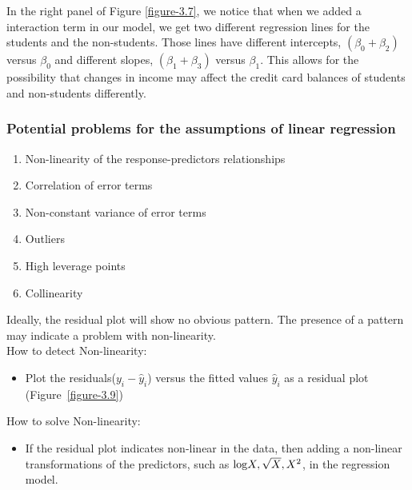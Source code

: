 \documentclass[12pt,a4paper]{article}%
\theoremstyle{definition}
\theoremstyle{plain}
\numberwithin{equation}{section}
\newcounter{subsubsubsection}[subsubsection]
\begin{document}
In the right panel of Figure \ref{figure-3.7}, we notice that when we added a interaction term in our model, we get two different regression lines for the students and the non-students.
Those lines have different intercepts, $(\beta_{0}+\beta_{2})$ versus $\beta_{0}$ and different slopes, $(\beta_{1}+\beta_{3})$ versus $\beta_{1}$.
This allows for the possibility that changes in income may affect the credit card balances of students and non-students differently.


\subsubsection{\textbf{Potential problems for the assumptions of linear regression}}
\begin{enumerate}
\item Non-linearity of the response-predictors relationships
\item Correlation of error terms
\item Non-constant variance of error terms
\item Outliers
\item High leverage points
\item Collinearity 
\end{enumerate}

\subsubsubsection{\color{blue}{Non-linearity of the Data}}
Ideally, the residual plot will show no obvious pattern. 
The presence of a pattern may indicate a problem with non-linearity. \\

How to detect Non-linearity:
\begin{itemize}
\item Plot the residuals($y_{i}-\hat{y}_{i}$) versus the fitted values $\hat{y}_{i}$ as a residual plot (Figure~\ref{figure-3.9})
\end{itemize}

How to solve Non-linearity:
\begin{itemize}
\item If the residual plot indicates non-linear in the data, then adding a non-linear transformations of the predictors, such as ${\rm log}X, \sqrt{X}, X^{2}$, in the regression model.
\end{itemize}
\end{document}
